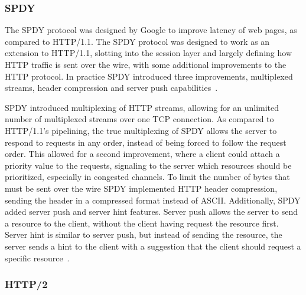 \documentclass[english, 12pt, a4paper, elec, utf8, a-2b, online]{aaltothesis}
\begin{document}
\subsubsection{SPDY}

The SPDY protocol was designed by Google to improve latency of web pages, as compared
to HTTP/1.1. The SPDY protocol was designed to work as an extension to HTTP/1.1,
slotting into the session layer and largely defining how HTTP traffic is sent over the
wire, with some additional improvements to the HTTP protocol. In practice SPDY
introduced three improvements, multiplexed streams, header compression and server push capabilities~\cite{spdy}.

SPDY introduced multiplexing of HTTP streams, allowing for an unlimited number
of multiplexed streams over one TCP connection. As compared to HTTP/1.1's pipelining,
the true multiplexing of SPDY allows the server to respond to requests in any order,
instead of being forced to follow the request order. This allowed for a second improvement,
where a client could attach a priority value to the requests, signaling to the server
which resources should be prioritized, especially in congested channels. To limit
the number of bytes that must be sent over the wire SPDY implemented HTTP header
compression, sending the header in a compressed format instead of ASCII. Additionally,
SPDY added server push and server hint features. Server push allows the server to
send a resource to the client, without the client having request the resource first.
Server hint is similar to server push, but instead of sending the resource, the
server sends a hint to the client with a suggestion that the client should request
a specific resource~\cite{spdy}.
\subsubsection{HTTP/2}
\end{document}
